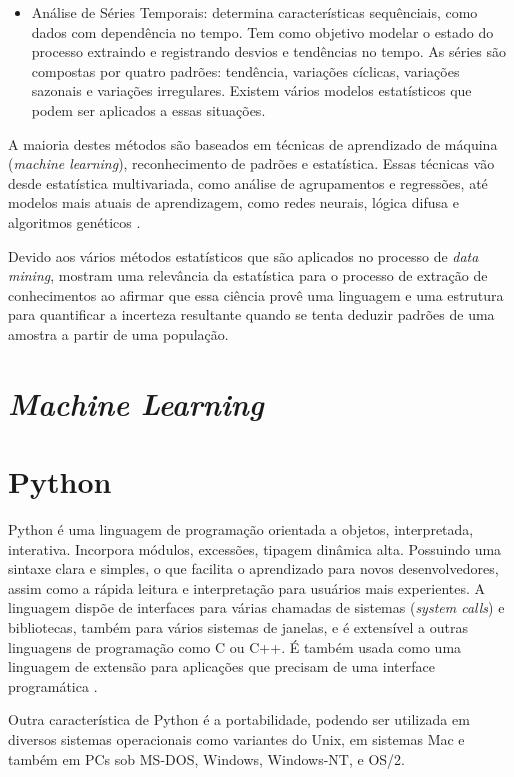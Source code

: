 \begin{itemize}
	\item Análise de Séries Temporais: determina características sequênciais, como dados com dependência no tempo. Tem como objetivo modelar o estado do processo extraindo e registrando desvios e tendências no tempo. As séries são compostas por quatro padrões: tendência, variações cíclicas, variações sazonais e variações irregulares. Existem vários modelos estatísticos que podem ser aplicados a essas situações.
\end{itemize}

A maioria destes métodos são baseados em técnicas de aprendizado de máquina (\textit{machine learning}), reconhecimento de padrões e estatística. Essas técnicas vão desde estatística multivariada, como análise de agrupamentos e regressões, até modelos mais atuais de aprendizagem, como redes neurais, lógica difusa e algoritmos genéticos \cite{conceito-data-mining}.

Devido aos vários métodos estatísticos que são aplicados no processo de \textit{data mining}, \cite{fayyad} mostram uma relevância da estatística para o processo de extração de conhecimentos ao afirmar que essa ciência provê uma linguagem e uma estrutura para quantificar a incerteza resultante quando se tenta deduzir padrões de uma amostra a partir de uma população.

\section{\textit{Machine Learning}}\label{sec:machine-learning}


\section{Python}\label{sec:python}
Python é uma linguagem de programação orientada a objetos, interpretada, interativa. Incorpora módulos, excessões, tipagem dinâmica alta. Possuindo uma sintaxe clara e simples, o que facilita o aprendizado para novos desenvolvedores, assim como a rápida leitura e interpretação para usuários mais experientes. A linguagem dispõe de interfaces para várias chamadas de sistemas (\textit{system calls}) e bibliotecas, também para vários sistemas de janelas, e é extensível a outras linguagens de programação como C ou C++. É também usada como uma linguagem de extensão para aplicações que precisam de uma interface programática \cite{python-doc}.

Outra característica de Python é a portabilidade, podendo ser utilizada em diversos sistemas operacionais como variantes do Unix, em sistemas Mac e também em PCs sob MS-DOS, Windows, Windows-NT, e OS/2.

